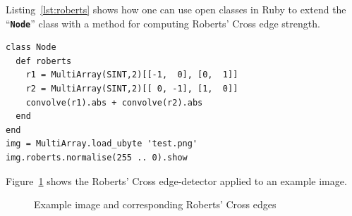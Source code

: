 \documentclass[12pt,a4paper,oneside,openright]{book}
\newcommand{\fig}[1]{Figure~\ref{fig:#1}}
\newcommand{\lst}[1]{Listing~\ref{lst:#1}}
\newcommand{\code}[1]{``\texttt{\textbf{\textcolor{codegray}{\small{#1}}}}''}
\begin{document}
\begin{CJK}{UTF8}{}
\lst{roberts} shows how one can use open classes in Ruby to extend the \code{Node} class with a method for computing Roberts' Cross edge strength.
\lstset{language=Ruby,frame=single,numbers=none}
\begin{lstlisting}[float,caption={Roberts' Cross edge-detector},escapechar=\$,label=lst:roberts]
class Node
  def roberts
    r1 = MultiArray(SINT,2)[[-1,  0], [0,  1]]
    r2 = MultiArray(SINT,2)[[ 0, -1], [1,  0]]
    convolve(r1).abs + convolve(r2).abs
  end
end
img = MultiArray.load_ubyte 'test.png'
img.roberts.normalise(255 .. 0).show
\end{lstlisting}
\fig{roberts} shows the Roberts' Cross edge-detector applied to an example image.
\begin{figure}[htbp]
   \begin{center}
     \begin{minipage}[t]{.45\textwidth}
     \end{minipage}
     \begin{minipage}[t]{.45\textwidth}
     \end{minipage}
     \caption{Example image and corresponding Roberts' Cross edges\label{fig:roberts}}
   \end{center}
\end{figure}


\end{CJK}
\end{document}
